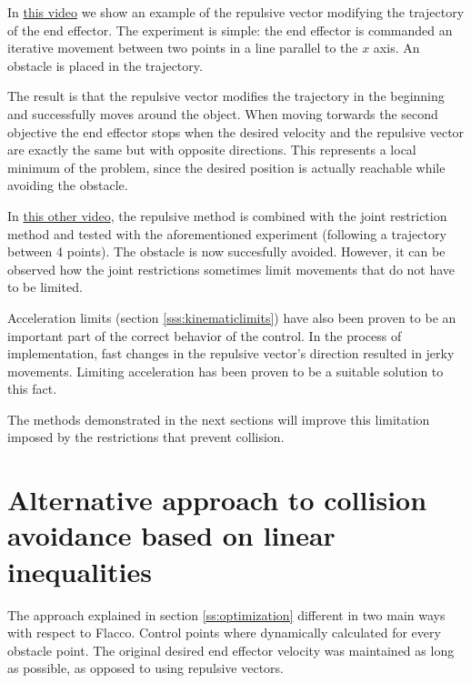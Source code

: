 In \href{https://www.youtube.com/watch?v=wuBuytagogg&list=PLnhdDYfKdsgimnQTQO-bmtKj-KRdbvGgS&index=5&t=0s}{this video} we show an example of the repulsive vector modifying the trajectory of the end effector. The experiment is simple: the end effector is commanded an iterative movement between two points in a line parallel to the $x$ axis. An obstacle is placed in the trajectory.

The result is that the repulsive vector modifies the trajectory in the beginning and successfully moves around the object. When moving torwards the second objective the end effector stops when the desired velocity and the repulsive vector are exactly the same but with opposite directions. This represents a local minimum of the problem, since the desired position is actually reachable while avoiding the obstacle.

In \href{https://www.youtube.com/watch?v=pIpwVOOHptI&list=PLnhdDYfKdsgimnQTQO-bmtKj-KRdbvGgS&index=6&t=0s}{this other video}, the repulsive method is combined with the joint restriction method and tested with the aforementioned experiment (following a trajectory between 4 points). The obstacle is now succesfully avoided. However, it can be observed how the joint restrictions sometimes limit movements that do not have to be limited.

Acceleration limits (section \ref{sss:kinematiclimits}) have also been proven to be an important part of the correct behavior of the control. In the process of implementation, fast changes in the repulsive vector's direction resulted in jerky movements. Limiting acceleration has been proven to be a suitable solution to this fact.

The methods demonstrated in the next sections will improve this limitation imposed by the restrictions that prevent collision.

\section{Alternative approach to collision avoidance based on linear inequalities}

The approach explained in section \ref{ss:optimization} different in two main ways with respect to Flacco. Control points where dynamically calculated for every obstacle point. The original desired end effector velocity was maintained as long as possible, as opposed to using repulsive vectors.

